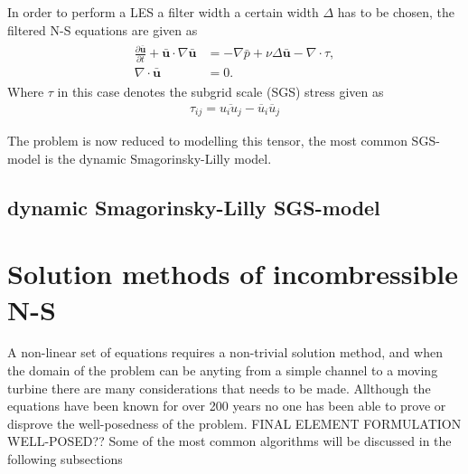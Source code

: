 In order to perform a LES a filter width a certain width $\Delta$ has to be chosen, 
the filtered N-S equations are given as 
%
\begin{align}
    \begin{split}
        \frac{\partial \mathbf{\bar{u}}}{\partial t} + \mathbf{\bar{u}}\cdot \nabla\mathbf{\bar{u}}
        &= -\nabla \bar{p} +\nu\Delta \mathbf{\bar{u}}-\nabla \cdot \tau, \\
        \nabla \cdot \mathbf{\bar{u}} &= 0.
    \end{split}
	\label{eq:NSfiltered}
\end{align}
%
Where $\tau$ in this case denotes the subgrid scale (SGS) stress given as 
\begin{align}
    \tau_{ij} = \overline{u_iu_j}-\overline{u}_i \overline{u}_j
    \label{eq:sgstensor}
\end{align}

The problem is now reduced to modelling this tensor, the most common SGS-model is the 
dynamic Smagorinsky-Lilly model.
\subsection{dynamic Smagorinsky-Lilly SGS-model}

\section{Solution methods of incombressible N-S}
A non-linear set of equations requires a non-trivial solution method, and when the domain of the problem can be anyting from a simple channel 
to a moving turbine there are many considerations that needs to be made. Allthough the equations have been known for over 200 years no one 
has been able to prove or disprove the well-posedness of the problem. FINAL ELEMENT FORMULATION WELL-POSED?? Some of the most common algorithms 
will be discussed in the following subsections

